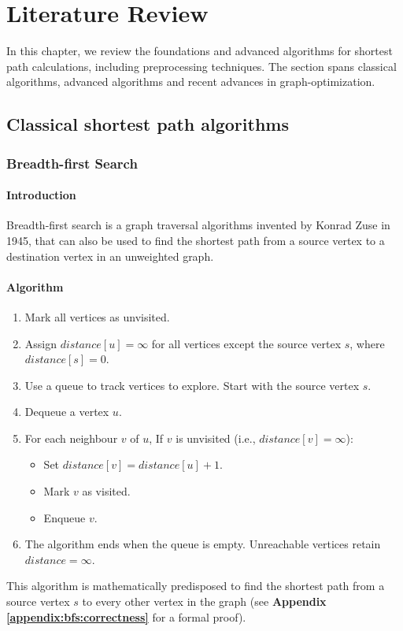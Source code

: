 \chapter{Literature Review}
 In this chapter, we review the foundations and advanced algorithms for shortest path calculations, including preprocessing techniques. The section spans classical algorithms, advanced algorithms and recent advances in graph-optimization.
\section{Classical shortest path algorithms}
	\subsection{Breadth-first Search}
		\subsubsection{Introduction}
		Breadth-first search is a graph traversal algorithms invented by Konrad Zuse in 1945, that can also be used to find the shortest path from a source vertex to a destination vertex in an unweighted graph.
		
		\subsubsection{Algorithm}
			\begin{enumerate}
				\item Mark all vertices as unvisited.
				\item Assign $distance[u] = \infty$ for all vertices except the source vertex $s$, where $distance[s] = 0$.
				\item Use a queue to track vertices to explore. Start with the source vertex $s$.
				\item Dequeue a vertex $u$.
				\item For each neighbour $v$ of $u$, If $v$ is unvisited (i.e., $distance[v]=\infty$):
					\begin{itemize}
						\item Set $distance[v] = distance[u] + 1$.
						\item Mark $v$ as visited.
						\item Enqueue $v$.
					\end{itemize}
				\item The algorithm ends when the queue is empty. Unreachable vertices retain $distance = \infty$.
			\end{enumerate}
			This algorithm is mathematically predisposed to find the shortest path from a source vertex $s$ to every other vertex in the graph (see\textbf{ Appendix \ref{appendix:bfs:correctness}} for a formal proof).
		
